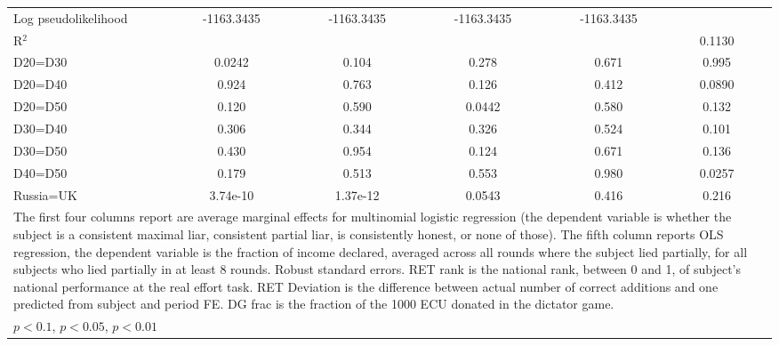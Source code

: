 \begin{tabular}{l|cccccccc|cc}
Log pseudolikelihood  & -1163.3435  &         &       -1163.3435            &         &     -1163.3435              &         &    -1163.3435        &   & & \\ 
R$^2$      &                  &         &                  &         &                  &         &           &  & 0.1130 &  \\ 
D20=D30         &   0.0242         &         &    0.104         &         &    0.278         &         &    0.671         &         &    0.995         &         \\
D20=D40         &    0.924         &         &    0.763         &         &    0.126         &         &    0.412         &         &   0.0890         &         \\
D20=D50         &    0.120         &         &    0.590         &         &   0.0442         &         &    0.580         &         &    0.132         &         \\
D30=D40         &    0.306         &         &    0.344         &         &    0.326         &         &    0.524         &         &    0.101         &         \\
D30=D50         &    0.430         &         &    0.954         &         &    0.124         &         &    0.671         &         &    0.136         &         \\
D40=D50         &    0.179         &         &    0.513         &         &    0.553         &         &    0.980         &         &   0.0257         &         \\
Russia=UK       & 3.74e-10         &         & 1.37e-12         &         &   0.0543         &         &    0.416         &         &    0.216         &         \\
\hline\hline
\multicolumn{11}{p{16.5cm}}{\tiny The first four columns report are average marginal effects for multinomial logistic regression (the dependent variable is whether the subject is a consistent maximal liar, consistent partial liar, is consistently honest, or none of those). The fifth column reports OLS regression, the dependent variable is the fraction of income declared, averaged across all rounds where the subject lied partially, for all subjects who lied partially in at least 8 rounds. Robust standard errors. RET rank is the national rank, between 0 and 1, of subject's national performance at the real effort task. RET Deviation is the difference between actual number of correct additions and one predicted from subject and period FE. DG frac is the fraction of the 1000 ECU donated in the dictator game.}\\
\multicolumn{11}{l}{\tiny \sym{*} \(p<0.1\), \sym{**} \(p<0.05\), \sym{***} \(p<0.01\)}\\
\end{tabular}